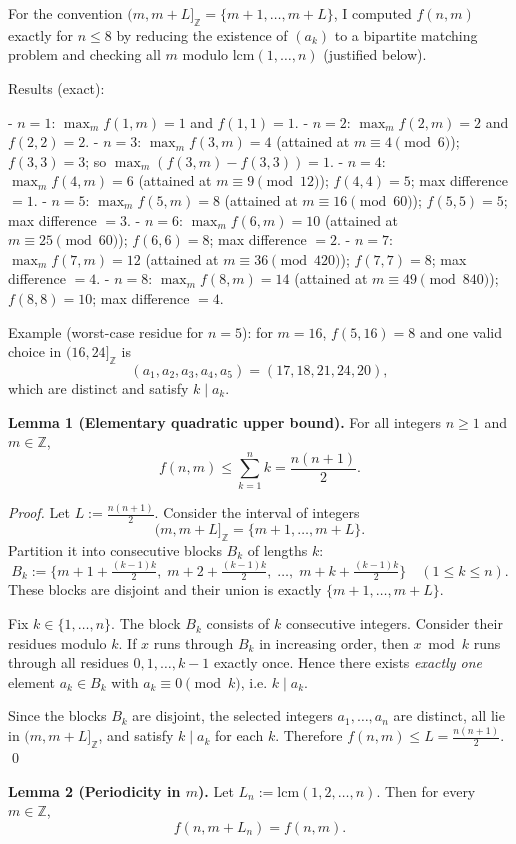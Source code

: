 For the convention $(m,m+L]_{\mathbb Z}=\{m+1,\dots,m+L\}$, I computed $f(n,m)$ exactly for $n\le 8$ by reducing the existence of $(a_k)$ to a bipartite matching problem and checking all $m$ modulo $\mathrm{lcm}(1,\dots,n)$ (justified below).

Results (exact):

- $n=1$: $\max_m f(1,m)=1$ and $f(1,1)=1$.
- $n=2$: $\max_m f(2,m)=2$ and $f(2,2)=2$.
- $n=3$: $\max_m f(3,m)=4$ (attained at $m\equiv 4\pmod 6$); $f(3,3)=3$; so $\max_m(f(3,m)-f(3,3))=1$.
- $n=4$: $\max_m f(4,m)=6$ (attained at $m\equiv 9\pmod{12}$); $f(4,4)=5$; max difference $=1$.
- $n=5$: $\max_m f(5,m)=8$ (attained at $m\equiv 16\pmod{60}$); $f(5,5)=5$; max difference $=3$.
- $n=6$: $\max_m f(6,m)=10$ (attained at $m\equiv 25\pmod{60}$); $f(6,6)=8$; max difference $=2$.
- $n=7$: $\max_m f(7,m)=12$ (attained at $m\equiv 36\pmod{420}$); $f(7,7)=8$; max difference $=4$.
- $n=8$: $\max_m f(8,m)=14$ (attained at $m\equiv 49\pmod{840}$); $f(8,8)=10$; max difference $=4$.

Example (worst-case residue for $n=5$): for $m=16$, $f(5,16)=8$ and one valid choice in $(16,24]_{\mathbb Z}$ is
\[
(a_1,a_2,a_3,a_4,a_5)=(17,18,21,24,20),
\]
which are distinct and satisfy $k\mid a_k$.

\medskip
\textbf{Lemma 1 (Elementary quadratic upper bound).}
For all integers $n\ge 1$ and $m\in\mathbb Z$,
\[
 f(n,m)\le \sum_{k=1}^n k = \frac{n(n+1)}2.
\]

\emph{Proof.}
Let $L:=\frac{n(n+1)}2$. Consider the interval of integers
\[
(m,m+L]_{\mathbb Z} = \{m+1,\dots,m+L\}.
\]
Partition it into consecutive blocks $B_k$ of lengths $k$:
\[
B_k := \{ m+1+\tfrac{(k-1)k}{2},\; m+2+\tfrac{(k-1)k}{2},\;\dots,\; m+k+\tfrac{(k-1)k}{2}\}\quad (1\le k\le n).
\]
These blocks are disjoint and their union is exactly $\{m+1,\dots,m+L\}$.

Fix $k\in\{1,\dots,n\}$. The block $B_k$ consists of $k$ consecutive integers.
Consider their residues modulo $k$. If $x$ runs through $B_k$ in increasing order, then $x\bmod k$ runs through all residues $0,1,\dots,k-1$ exactly once. Hence there exists \emph{exactly one} element $a_k\in B_k$ with $a_k\equiv 0\pmod k$, i.e. $k\mid a_k$.

Since the blocks $B_k$ are disjoint, the selected integers $a_1,\dots,a_n$ are distinct, all lie in $(m,m+L]_{\mathbb Z}$, and satisfy $k\mid a_k$ for each $k$. Therefore $f(n,m)\le L=\frac{n(n+1)}2$.
\qed

\medskip
\textbf{Lemma 2 (Periodicity in $m$).}
Let $L_n:=\mathrm{lcm}(1,2,\dots,n)$. Then for every $m\in\mathbb Z$,
\[
 f(n,m+L_n)=f(n,m).
\]


